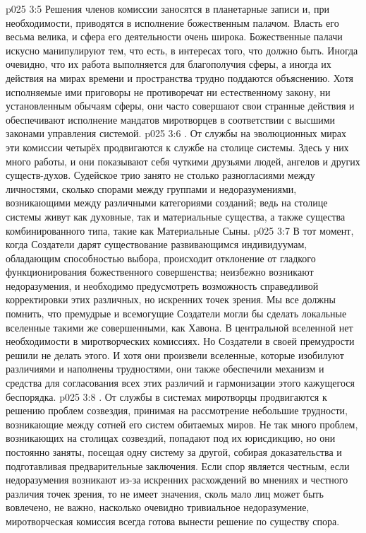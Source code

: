 \vs p025 3:5 Решения членов комиссии заносятся в планетарные записи и, при необходимости, приводятся в исполнение божественным палачом. Власть его весьма велика, и сфера его деятельности очень широка. Божественные палачи искусно манипулируют тем, что есть, в интересах того, что должно быть. Иногда очевидно, что их работа выполняется для благополучия сферы, а иногда их действия на мирах времени и пространства трудно поддаются объяснению. Хотя исполняемые ими приговоры не противоречат ни естественному закону, ни установленным обычаям сферы, они часто совершают свои странные действия и обеспечивают исполнение мандатов миротворцев в соответствии с высшими законами управления системой.
\vs p025 3:6 . От службы на эволюционных мирах эти комиссии четырёх продвигаются к службе на столице системы. Здесь у них много работы, и они показывают себя чуткими друзьями людей, ангелов и других существ\hyp{}духов. Судейское трио занято не столько разногласиями между личностями, сколько спорами между группами и недоразумениями, возникающими между различными категориями созданий; ведь на столице системы живут как духовные, так и материальные существа, а также существа комбинированного типа, такие как Материальные Сыны.
\vs p025 3:7 В тот момент, когда Создатели дарят существование развивающимся индивидуумам, обладающим способностью выбора, происходит отклонение от гладкого функционирования божественного совершенства; неизбежно возникают недоразумения, и необходимо предусмотреть возможность справедливой корректировки этих различных, но искренних точек зрения. Мы все должны помнить, что премудрые и всемогущие Создатели могли бы сделать локальные вселенные такими же совершенными, как Хавона. В центральной вселенной нет необходимости в миротворческих комиссиях. Но Создатели в своей премудрости решили не делать этого. И хотя они произвели вселенные, которые изобилуют различиями и наполнены трудностями, они также обеспечили механизм и средства для согласования всех этих различий и гармонизации этого кажущегося беспорядка.
\vs p025 3:8 . От службы в системах миротворцы продвигаются к решению проблем созвездия, принимая на рассмотрение небольшие трудности, возникающие между сотней его систем обитаемых миров. Не так много проблем, возникающих на столицах созвездий, попадают под их юрисдикцию, но они постоянно заняты, посещая одну систему за другой, собирая доказательства и подготавливая предварительные заключения. Если спор является честным, если недоразумения возникают из\hyp{}за искренних расхождений во мнениях и честного различия точек зрения, то не имеет значения, сколь мало лиц может быть вовлечено, не важно, насколько очевидно тривиальное недоразумение, миротворческая комиссия всегда готова вынести решение по существу спора.
